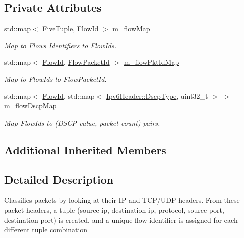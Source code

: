 \subsection*{Private Attributes}
\begin{DoxyCompactItemize}
\item 
std\+::map$<$ \hyperlink{structns3_1_1Ipv6FlowClassifier_1_1FiveTuple}{Five\+Tuple}, \hyperlink{group__flow-monitor_ga39a766c4a370cdb9ab8ac85da4b288e9}{Flow\+Id} $>$ \hyperlink{classns3_1_1Ipv6FlowClassifier_a2ba466f42f102ab81aed0d5cffde57a1}{m\+\_\+flow\+Map}
\begin{DoxyCompactList}\small\item\em Map to Flows Identifiers to Flow\+Ids. \end{DoxyCompactList}\item 
std\+::map$<$ \hyperlink{group__flow-monitor_ga39a766c4a370cdb9ab8ac85da4b288e9}{Flow\+Id}, \hyperlink{group__flow-monitor_gaa1cb18250e1672975204f1254b8aa2ae}{Flow\+Packet\+Id} $>$ \hyperlink{classns3_1_1Ipv6FlowClassifier_adfa0df24172af71f377bc0b56456e1ae}{m\+\_\+flow\+Pkt\+Id\+Map}
\begin{DoxyCompactList}\small\item\em Map to Flow\+Ids to Flow\+Packet\+Id. \end{DoxyCompactList}\item 
std\+::map$<$ \hyperlink{group__flow-monitor_ga39a766c4a370cdb9ab8ac85da4b288e9}{Flow\+Id}, std\+::map$<$ \hyperlink{classns3_1_1Ipv6Header_afdc89ed9acd990a7613782323e4c95ee}{Ipv6\+Header\+::\+Dscp\+Type}, uint32\+\_\+t $>$ $>$ \hyperlink{classns3_1_1Ipv6FlowClassifier_ae351d1b8e71e5253d34cfb3e7ee3ec2a}{m\+\_\+flow\+Dscp\+Map}
\begin{DoxyCompactList}\small\item\em Map Flow\+Ids to (D\+S\+CP value, packet count) pairs. \end{DoxyCompactList}\end{DoxyCompactItemize}
\subsection*{Additional Inherited Members}


\subsection{Detailed Description}
Classifies packets by looking at their IP and T\+C\+P/\+U\+DP headers. From these packet headers, a tuple (source-\/ip, destination-\/ip, protocol, source-\/port, destination-\/port) is created, and a unique flow identifier is assigned for each different tuple combination 

